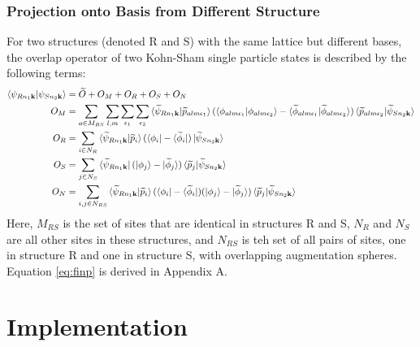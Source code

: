 \documentclass[12pt]{article}
\begin{document}
\subsubsection{Projection onto Basis from Different Structure}
For two structures (denoted R and S) with the same
lattice but different bases, the overlap operator of two Kohn-Sham single particle states
is described by the following terms:
\begin{equation}
\centering
\begin{split}
\braket{\psi_{Rn_1\mathbf{k}}|\psi_{Sn_2\mathbf{k}}} & =\widetilde{O}+O_M+O_R+O_S+O_N\\
O_M & =\sum_{a\in M_{RS}}\sum_{l,m}\sum_{\epsilon_1}\sum_{\epsilon_2}
\braket{\widetilde{\psi}_{Rn_1\mathbf{k}}|\widetilde{p}_{a\ind _1}}
(\braket{\phi_{a\ind _1}|{\phi_{a\ind _2}}}
-\braket{\widetilde{\phi}_{a\ind _1}|\widetilde{\phi}_{a\ind _2}})
\braket{\widetilde{p}_{a\ind _2}|\widetilde{\psi}_{Sn_2\mathbf{k}}}\\
O_R & =\sum_{i\in N_R}\braket{\widetilde{\psi}_{Rn_1\mathbf{k}}|\widetilde{p}_i}
(\bra{\phi_i}-\bra{\widetilde{\phi}_i})
\ket{\widetilde{\psi}_{Sn_2\mathbf{k}}}\\
O_S & =\sum_{j\in N_S}\bra{\widetilde{\psi}_{Rn_1\mathbf{k}}}(\ket{\phi_j}-\ket{\widetilde{\phi}_j})
\braket{\widetilde{p}_j|\widetilde{\psi}_{Sn_2\mathbf{k}}}\\
O_N & =\sum_{i,j\in N_{RS}}\braket{\widetilde{\psi}_{Rn_1\mathbf{k}}|
\widetilde{p}_i}(\bra{\phi_i}-\bra{\widetilde{\phi}_i})
(\ket{\phi_j}-\ket{\widetilde{\phi}_j})\braket{\widetilde{p}_j|\widetilde{\psi}_{Sn_2\mathbf{k}}}
\end{split}
\label{eq:finp}
\end{equation}
Here, $M_{RS}$ is the set of sites that are identical in structures R and S,
$N_R$ and $N_S$ are all other sites in these structures,
and $N_{RS}$ is teh set of all pairs of sites, one in structure R and one in structure
S, with overlapping augmentation spheres. Equation \ref{eq:finp} is derived in Appendix A.

\section{Implementation}
\end{document}
